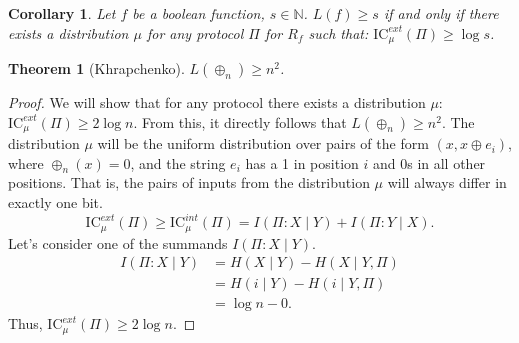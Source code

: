 \documentclass[12pt,sans]{article}
\newcommand{\IC}{\mathrm{IC}}
\theoremstyle{definition}
\theoremstyle{plain}
\newtheorem{theorem}{Theorem}[section]
\newtheorem{corollary}{Corollary}[section]
\theoremstyle{remark}
\begin{document}
\begin{corollary}
    Let $f$ be a boolean function, $s \in \mathbb{N}$. $L(f) \ge s$ if and only if there exists a distribution $\mu$ for any protocol $\Pi$ for $R_f$ such that:
    $\IC_\mu^{ext}(\Pi) \ge \log s$.
\end{corollary}

\begin{theorem}[Khrapchenko]
    $L(\oplus_n) \ge n^2$.
\end{theorem}
\begin{proof}
    We will show that for any protocol there exists a distribution $\mu$: $\IC^{ext}_\mu(\Pi) \ge 2\log n$.
    From this, it directly follows that $L(\oplus_n) \ge n^2$.
    The distribution $\mu$ will be the uniform distribution over pairs of the form $(x,x \oplus e_i)$,
    where $\oplus_n(x) = 0$, and the string $e_i$ has a 1 in position $i$ and 0s in all other positions.
    That is, the pairs of inputs from the distribution $\mu$ will always differ in exactly one bit.
    \[
    \IC_\mu^{ext}(\Pi)
    \ge \IC_\mu^{int}(\Pi)
    = I(\Pi:X \mid Y) + I(\Pi:Y \mid X).
    \]
    Let's consider one of the summands $I(\Pi:X \mid Y)$.
    \[\begin{aligned}
        I(\Pi:X \mid Y) &= H(X \mid Y) - H(X \mid Y,\Pi)\\
        &= H(i \mid Y) - H(i \mid Y,\Pi)\\
        &= \log n - 0.
    \end{aligned}\]
    Thus, $\IC_\mu^{ext}(\Pi) \ge 2\log n$.
\end{proof}
\end{document}

